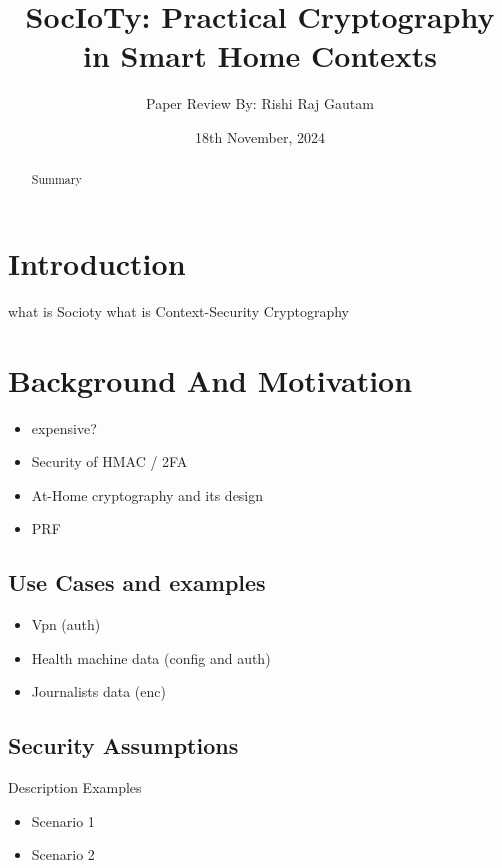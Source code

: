 \documentclass{article}
\title{SocIoTy: Practical Cryptography in Smart Home Contexts}
\author{Paper Review By: Rishi Raj Gautam}
\date{18th November, 2024}
\begin{document}
\maketitle

\begin{abstract}

Summary

\end{abstract}

\section{Introduction}

what is Socioty\newline
what is Context-Security Cryptography

\section{Background And Motivation}
\begin{itemize}
    \item expensive?
    \item Security of HMAC / 2FA
    \item At-Home cryptography and its design
    \item PRF
\end{itemize}

    \subsection{Use Cases and examples}
    \begin{itemize}
        \item Vpn (auth)
        \item Health machine data (config and auth)
        \item Journalists data (enc)
    \end{itemize}

    \subsection{Security Assumptions}
    Description
    Examples
        \begin{itemize}
            \item Scenario 1
            \item Scenario 2
    \end{itemize}

\end{document}
